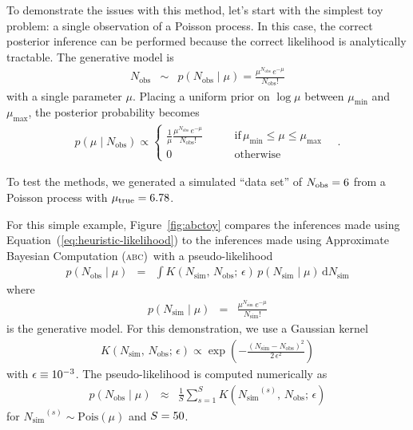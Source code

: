 \documentclass[manuscript, letterpaper]{aastex}
\newcommand{\accronym}[1]{\textsc{#1}}
\newcommand{\dfmfigref}[1]{\ref{fig:#1}}
\newcommand{\dfmFig}[1]{Figure~\dfmfigref{#1}}
\newcommand{\dfmfig}[1]{\dfmFig{#1}}
\renewcommand{\eqref}[1]{\ref{eq:#1}}
\newcommand{\Eq}[1]{Equation~(\eqref{#1})}
\newcommand{\eq}[1]{\Eq{#1}}
\newcommand{\dd}{\ensuremath{\,\mathrm{d}}}
\newcommand{\obs}{{\ensuremath{\mathrm{obs}}}}
\newcommand{\simu}{{\ensuremath{\mathrm{sim}}}}
\def\abc{Approximate Bayesian Computation (\accronym{abc})\def\abc{\accronym{abc}}}
\begin{document}
To demonstrate the issues with this method, let's start with the simplest toy
problem: a single observation of a Poisson process.
In this case, the correct posterior inference can be performed because the
correct likelihood is analytically tractable.
The generative model is
\begin{eqnarray}
N_\obs &\sim& p(N_\obs\mid\mu) = \frac{\mu^{N_\obs}\,e^{-\mu}}{N_\obs!}
\end{eqnarray}
with a single parameter $\mu$.
Placing a uniform prior on $\log\mu$ between $\mu_\mathrm{min}$ and
$\mu_\mathrm{max}$, the posterior probability becomes
\begin{eqnarray}
p(\mu\mid N_\obs) \propto \left\{\begin{array}{ll}
    \frac{1}{\mu}\frac{\mu^{N_\obs}\,e^{-\mu}}{N_\obs!}\quad & \quad
       \mathrm{if}\,\mu_\mathrm{min} \le \mu \le \mu_\mathrm{max} \\
    0 \quad & \quad \mathrm{otherwise}
\end{array}\right. \quad.
\end{eqnarray}

To test the methods, we generated a simulated ``data set'' of $N_\obs =
\abctoynobs$ from a Poisson process with $\mu_\mathrm{true} = {6.78}$.

For this simple example, \dfmfig{abctoy} compares the inferences made using
\eq{heuristic-likelihood} to the inferences made using \abc\ with a
pseudo-likelihood
\begin{eqnarray}
p(N_\obs\mid\mu) &=& \int K(N_\simu,\,N_\obs;\,\epsilon)\,
    p(N_\simu\mid\mu) \dd N_\simu
\end{eqnarray}
where
\begin{eqnarray}
p(N_\simu\mid\mu) &=& \frac{\mu^{N_\simu}\,e^{-\mu}}{N_\simu!}
\end{eqnarray}
is the generative model.
For this demonstration, we use a Gaussian kernel
\begin{eqnarray}
K(N_\simu,\,N_\obs;\,\epsilon) \propto \exp\left(
    -\frac{(N_\simu - N_\obs)^2}{2\,\epsilon^2}
\right)
\end{eqnarray}
with $\epsilon \equiv {\ensuremath{10^{-3}}}$.
The pseudo-likelihood is computed numerically as
\begin{eqnarray}
p(N_\obs\mid\mu) &\approx& \frac{1}{S}\sum_{s=1}^S
    K({N_\simu}^{(s)},\,N_\obs;\,\epsilon)
\end{eqnarray}
for ${N_\simu}^{(s)} \sim \mathrm{Pois}(\mu)$ and $S = {50}$.
\end{document}
